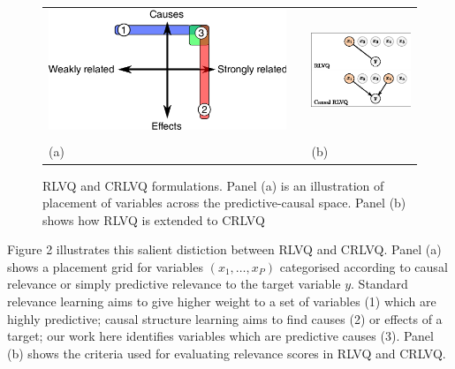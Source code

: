 \documentclass{esannV2}
\begin{document}
\begin{figure}[!h]
\begin{tabular}{m{}cm{}}
\includegraphics[width=.5\textwidth]{causal-relevance-dimensions.eps} & &
\includegraphics[width=.4\textwidth]{rlvq-crlvq.eps} \\
& \\
(a) & & (b)  
\end{tabular}
\label{fig:causes}
\caption{RLVQ and CRLVQ formulations. Panel (a) is an illustration of placement of variables across the predictive-causal space. Panel (b) shows how RLVQ is extended to CRLVQ}
\end{figure}

Figure 2 illustrates this salient distiction between RLVQ and CRLVQ. Panel (a) shows a placement grid for variables $(x_1, \ldots, x_P)$ categorised according to causal relevance or simply predictive relevance to the target variable $y$. Standard relevance learning aims to give higher weight to a set of variables (1) which are highly predictive; causal structure learning aims to find causes (2) or effects of a target; our work here identifies variables which are predictive causes (3). Panel (b) shows the criteria used for evaluating relevance scores in RLVQ and CRLVQ.
\end{document}
